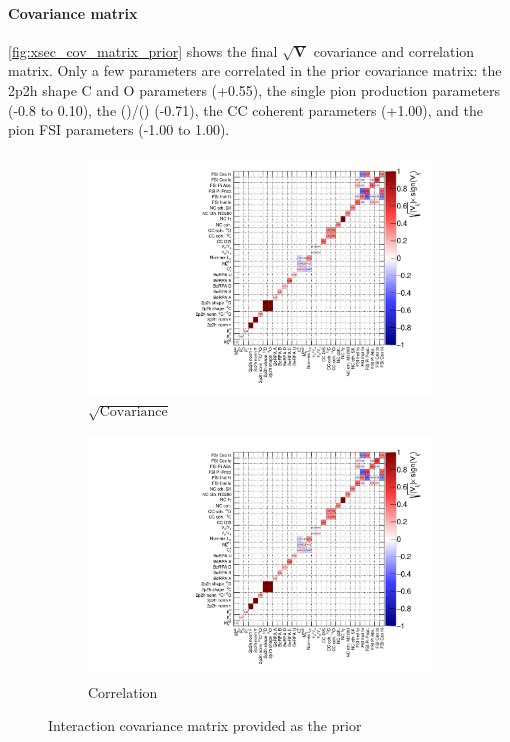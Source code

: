 \paragraph{Covariance matrix}
\autoref{fig:xsec_cov_matrix_prior} shows the final $\sqrt{\textbf{V}}$ covariance and correlation matrix. Only a few parameters are correlated in the prior covariance matrix: the 2p2h shape C and O parameters (+0.55), the single pion production parameters (-0.8 to 0.10), the \nue(\nuebar)/\numu(\numubar) (-0.71), the CC coherent parameters (+1.00), and the pion FSI parameters (-1.00 to 1.00).
\begin{figure}[h]
	\begin{subfigure}[t]{0.49\textwidth}
		\includegraphics[width=\textwidth, trim={0mm 0mm 0mm 0mm}, clip, page=1] {figures/niwg/xsec_covariance_2017b_NOMINAL_v1_xseccov}
		\caption{$\sqrt{\text{Covariance}}$}
		\label{fig:xsec_cov_matrix_vij}
	\end{subfigure}
	\begin{subfigure}[t]{0.49\textwidth}
		\includegraphics[width=\textwidth, trim={0mm 0mm 0mm 0mm}, clip, page=2] {figures/niwg/xsec_covariance_2017b_NOMINAL_v1_xseccov}
		\caption{Correlation}
	\end{subfigure}
	\caption{Interaction covariance matrix provided as the prior}
	\label{fig:xsec_cov_matrix_prior}
\end{figure}

